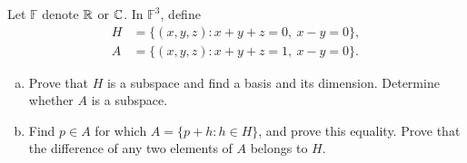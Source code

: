 \begin{exercise}
  \label{ex:hw01:affine-solution-set}
  Let \(\mathbb F\) denote \(\mathbb{R}\) or \(\mathbb{C}\). In \(\mathbb F^3\), define
  \[
    \begin{aligned}
      H&=\{(x,y,z):x+y+z=0,\ x-y=0\},\\
      A&=\{(x,y,z):x+y+z=1,\ x-y=0\}.
    \end{aligned}
  \]
  \begin{enumerate}[(a)][2]
    \item Prove that \(H\) is a subspace and find a basis and its dimension.
      Determine whether \(A\) is a subspace.
    \item Find \(p\in A\) for which \(A=\{p+h:h\in H\}\), and prove
      this equality. Prove that the difference of any two elements of
      \(A\) belongs to \(H\).
  \end{enumerate}
\end{exercise}
